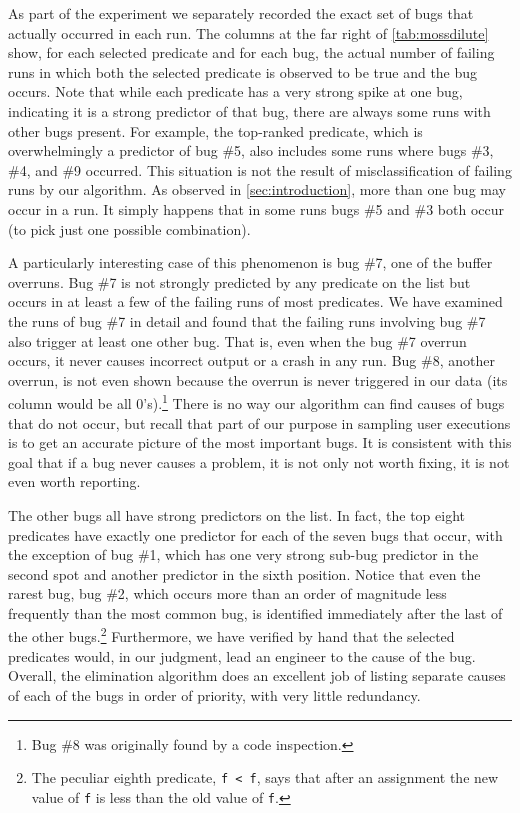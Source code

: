 As part of the experiment we separately recorded the exact set of
bugs that actually occurred in each run.
The columns at the far right of \autoref{tab:mossdilute} show, for
each selected predicate and for each bug, the actual number of failing
runs in which both the selected predicate is observed to be true and
the bug occurs.
Note that while each
predicate has a very strong spike at one bug, indicating it is a
strong predictor of that bug, there are always some runs with other
bugs present.  For example, the top-ranked predicate, which is
overwhelmingly a predictor of bug \#5, also includes some runs where
bugs \#3, \#4, and \#9 occurred.  This situation is not the result of
misclassification of failing runs by our algorithm.  As observed in
\autoref{sec:introduction}, more than one bug may occur in a run.
It simply happens that in some runs bugs \#5 and \#3 both occur (to
pick just one possible combination).

A particularly interesting case of this phenomenon is bug \#7, one of
the buffer overruns.  Bug \#7 is not strongly predicted by any
predicate on the list but occurs in at least a few of the
failing runs of most predicates.  We have examined the runs of bug \#7
in detail and found that the failing runs involving bug \#7 also
trigger at least one other bug.  That is, even when the bug \#7 overrun
occurs, it never causes incorrect output or a crash
in any run.  Bug \#8, another overrun, is not even shown because the
overrun is never triggered in our data (its column would be all
0's).\footnote{Bug \#8 was originally found by a code inspection.}
There is no way our algorithm can find causes of bugs that do not
occur, but recall that part of our purpose in sampling user executions
is to get an accurate picture of the most important bugs.  It is
consistent with this goal that if a bug never causes a problem, it is
not only not worth fixing, it is not even worth reporting.

The other bugs all have strong predictors on the list.  In fact,
the top eight predicates have exactly one predictor for each of the seven
bugs that occur, with the exception of bug \#1, which has one very
strong sub-bug predictor in the second spot and another predictor
in the sixth position.  Notice that even the rarest bug, bug \#2,
which occurs more than an order of magnitude less frequently than
the most common bug, is identified immediately after the last of
the other bugs.\footnote{The peculiar eighth predicate, \texttt{f < f},
says that after an assignment the new value of \texttt{f} is less than
the old value of \texttt{f}.}  Furthermore, we have verified by hand that
the selected predicates would, in our judgment, lead an engineer to
the cause of the bug. Overall, the elimination algorithm does an excellent
job of listing separate causes of each of the bugs in order of priority,
with very little redundancy.

